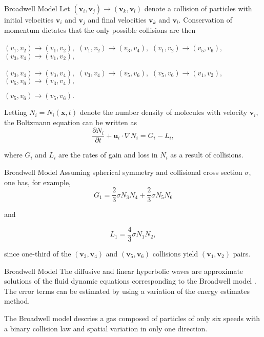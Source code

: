 \documentclass[12pt,xcolor={table,dvipsnames},t]{beamer}
\begin{document}
\begin{frame}{Broadwell Model}
    Let  $  ( \mathbf v _ {i} , \mathbf v _ {j} ) \rightarrow ( \mathbf v _ {k} , \mathbf v _ {l} ) $
denote a collision of particles with initial velocities  $  \mathbf v _ {i} $
and  $  \mathbf v _ {j} $
and final velocities  $  \mathbf v _ {k} $
and  $  \mathbf v _ {l} $. 
Conservation of momentum dictates that the only possible collisions are then

$
( v _ {1} , v _ {2} ) \rightarrow ( v _ {1} , v _ {2} ) ,
$ $
( v _ {1} , v _ {2} ) \rightarrow ( v _ {3} , v _ {4} ) , 
$ $
( v _ {1} ,v _ {2} ) \rightarrow ( v _ {5} , v _ {6} ) ,
$ $
( v _ {3} , v _ {4} ) \rightarrow ( v _ {1} , v _ {2} ) , 
$ 

$
( v _ {3} , v _ {4} ) \rightarrow ( v _ {3} , v _ {4} ) ,
$ $
( v _ {3} , v _ {4} ) \rightarrow ( v _ {5} , v _ {6} ) , 
$ $
( v _ {5} , v _ {6} ) \rightarrow ( v _ {1} , v _ {2} ) ,
$ $
( v _ {5} , v _ {6} ) \rightarrow ( v _ {3} , v _ {4} ) , 
$

$
( v _ {5} , v _ {6} ) \rightarrow ( v _ {5} , v _ {6} ) .
$



Letting  $  N _ {i} = N _ {i} ( \mathbf x,t ) $
denote the number density of molecules with velocity  $  \mathbf v _ {i} $, 
the Boltzmann equation can be written as
$$ 
{
\frac{\partial  N _ {i} }{\partial  t }
 } + \mathbf u _ {i} \cdot \nabla N _ {i} = G _ {i} - L _ {i} ,
$$

where  $  G _ {i} $
and  $  L _ {i} $
are the rates of gain and loss in  $  N _ {i} $
as a result of collisions. 
\end{frame}

\begin{frame}{Broadwell Model}
Assuming spherical symmetry and collisional cross section  $  \sigma $, 
one has, for example,
    $$ 
G _ {1} = {
\frac{2}{3}
 } \sigma N _ {3} N _ {4} + {
\frac{2}{3}
 } \sigma N _ {5} N _ {6}  $$

and

$$ 
L _ {1} = {
\frac{4}{3}
 } \sigma N _ {1} N _ {2} ,
$$

since one-third of the  $  ( \mathbf v _ {3} , \mathbf v _ {4} ) $
and  $  ( \mathbf v _ {5} , \mathbf v _ {6} ) $
collisions yield  $  ( \mathbf v _ {1} , \mathbf v _ {2} ) $
pairs.
\end{frame}

\begin{frame}{Broadwell Model}
The diffusive and linear hyperbolic waves are approximate solutions of the fluid dynamic equations corresponding to the Broadwell model . The error terms can be estimated by using a variation of the energy estimates method.

The Broadwell model descries a gas composed of particles of only six speeds with a binary collision law and spatial variation in only one direction. 
\end{frame}
\end{document}
